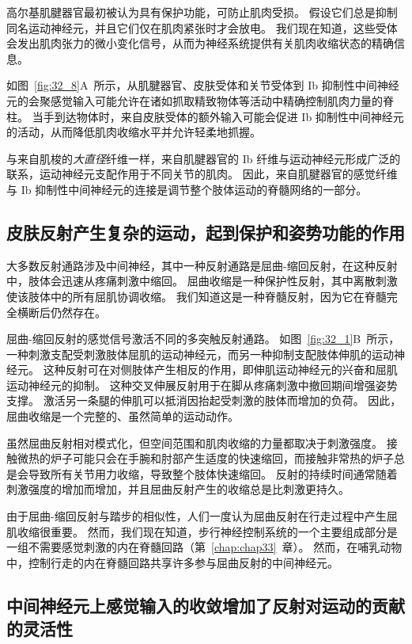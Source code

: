 高尔基肌腱器官最初被认为具有保护功能，可防止肌肉受损。
假设它们总是抑制同名运动神经元，并且它们仅在肌肉紧张时才会放电。
我们现在知道，这些受体会发出肌肉张力的微小变化信号，从而为神经系统提供有关肌肉收缩状态的精确信息。


如图~\ref{fig:32_8}A~所示，从肌腱器官、皮肤受体和关节受体到 Ib 抑制性中间神经元的会聚感觉输入可能允许在诸如抓取精致物体等活动中精确控制肌肉力量的脊柱。
当手到达物体时，来自皮肤受体的额外输入可能会促进 Ib 抑制性中间神经元的活动，从而降低肌肉收缩水平并允许轻柔地抓握。


与来自肌梭的\textit{大直径}纤维一样，来自肌腱器官的 Ib 纤维与运动神经元形成广泛的联系，运动神经元支配作用于不同关节的肌肉。
因此，来自肌腱器官的感觉纤维与 Ib 抑制性中间神经元的连接是调节整个肢体运动的脊髓网络的一部分。



\subsection{皮肤反射产生复杂的运动，起到保护和姿势功能的作用}

大多数反射通路涉及中间神经，其中一种反射通路是屈曲-缩回反射，在这种反射中，肢体会迅速从疼痛刺激中缩回。
屈曲收缩是一种保护性反射，其中离散刺激使该肢体中的所有屈肌协调收缩。
我们知道这是一种脊髓反射，因为它在脊髓完全横断后仍然存在。


屈曲-缩回反射的感觉信号激活不同的多突触反射通路。 
如图~\ref{fig:32_1}B~所示，一种刺激支配受刺激肢体屈肌的运动神经元，而另一种抑制支配肢体伸肌的运动神经元。
这种反射可在对侧肢体产生相反的作用，即伸肌运动神经元的兴奋和屈肌运动神经元的抑制。
这种交叉伸展反射用于在脚从疼痛刺激中撤回期间增强姿势支撑。
激活另一条腿的伸肌可以抵消因抬起受刺激的肢体而增加的负荷。
因此，屈曲收缩是一个完整的、虽然简单的运动动作。


虽然屈曲反射相对模式化，但空间范围和肌肉收缩的力量都取决于刺激强度。
接触微热的炉子可能只会在手腕和肘部产生适度的快速缩回，而接触非常热的炉子总是会导致所有关节用力收缩，导致整个肢体快速缩回。
反射的持续时间通常随着刺激强度的增加而增加，并且屈曲反射产生的收缩总是比刺激更持久。


由于屈曲-缩回反射与踏步的相似性，人们一度认为屈曲反射在行走过程中产生屈肌收缩很重要。
然而，我们现在知道，步行神经控制系统的一个主要组成部分是一组不需要感觉刺激的内在脊髓回路（第~\ref{chap:chap33}~章）。
然而，在哺乳动物中，控制行走的内在脊髓回路共享许多参与屈曲反射的中间神经元。



\subsection{中间神经元上感觉输入的收敛增加了反射对运动的贡献的灵活性}

